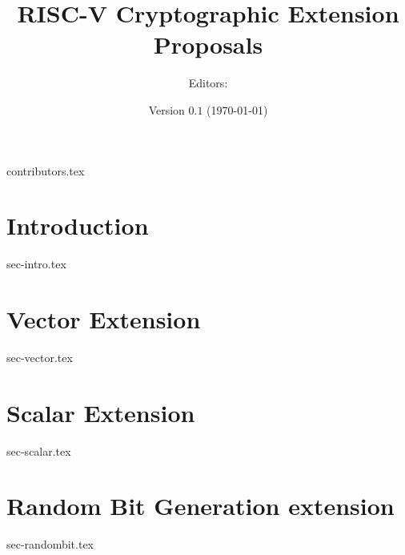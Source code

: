 \documentclass[11pt]{article}
\title{RISC-V Cryptographic Extension Proposals}
\author{Editors: }
\date{Version $0.1$ (\today)}
\begin{document}

\maketitle

{contributors.tex}

\tableofcontents


\section{Introduction}
\label{sec:intro}
{sec-intro.tex}

\section{Vector Extension}
\label{sec:vector}
{sec-vector.tex}

\section{Scalar Extension}
\label{sec:scalar}
{sec-scalar.tex}

\section{Random Bit Generation extension}
\label{sec:randombit}
{sec-randombit.tex}



\appendix

%
%


\printbibliography
\end{document}
